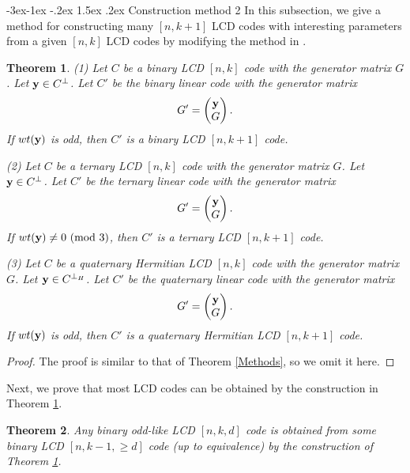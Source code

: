 \documentclass[12pt,twoside]{article}
\makeatletter
\renewcommand\subsection{\@startsection{subsection}{2}{\z@}%
                                     {-3ex\@plus -1ex \@minus -.2ex}%
                                     {1.5ex \@plus .2ex}%
                                     {\normalfont\normalsize\bfseries}}
\theoremstyle{plain}
\newtheorem{theorem}{Theorem}[section]
\theoremstyle{definition}
\theoremstyle{remark}
\makeatother
\begin{document}
\subsection{Construction method 2}
In this subsection, we give a method for constructing many $[n,k+1]$ LCD codes with interesting parameters from a given $[n,k]$ LCD codes by modifying the method in \cite{34-LCD}.
\begin{theorem}\label{Methods-2}
{\rm(1)} Let $C$ be a binary LCD $[n,k]$ code with the generator matrix $G$. Let ${\bf y}\in C^\perp$. Let $C'$ be the binary linear code with the generator matrix
$$
G'=\begin{pmatrix}
 {\bf y} \\
  G
\end{pmatrix}.
$$
If $wt({\bf y})$ is odd, then $C'$ is a binary LCD $[n,k+1]$ code.

{\rm(2)} Let $C$ be a ternary LCD $[n,k]$ code with the generator matrix $G$. Let ${\bf y}\in C^\perp$. Let $C'$ be the ternary linear code with the generator matrix
$$
G'=\begin{pmatrix}
 {\bf y} \\
  G
\end{pmatrix}.
$$
If $wt({\bf y})\neq 0\ ({\rm mod}\ 3)$, then $C'$ is a ternary LCD $[n,k+1]$ code.

{\rm(3)} Let $C$ be a quaternary Hermitian LCD $[n,k]$ code with the generator matrix $G$. Let ${\bf y}\in C^{\perp_H}$. Let $C'$ be the quaternary linear code with the generator matrix
$$
G'=\begin{pmatrix}
 {\bf y} \\
 G
\end{pmatrix}.
$$
If $wt({\bf y})$ is odd, then $C'$ is a quaternary Hermitian LCD $[n,k+1]$ code.
\end{theorem}

\begin{proof}
The proof is similar to that of Theorem \ref{Methods}, so we omit it here.
\end{proof}

Next, we prove that most LCD codes can be obtained by
the construction in Theorem \ref{Methods-2}.

\begin{theorem}\label{up-2}
Any binary odd-like LCD $[n,k,d]$ code is obtained from some binary LCD $[n,k-1,\geq d]$ code (up to equivalence) by the construction of Theorem \ref{Methods-2}.
\end{theorem}
\end{document}
